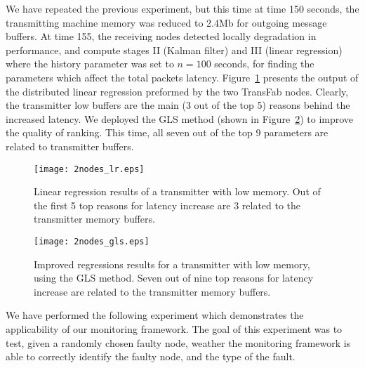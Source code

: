 \documentclass[times, 10pt,twocolumn]{article}
\begin{document}
We have repeated the previous experiment, but this time at time 150 seconds, the transmitting machine memory was reduced to 2.4Mb for outgoing message buffers. At time 155, the receiving nodes detected locally degradation in performance, and compute stages II (Kalman filter) and III (linear regression) where the history parameter was set to $n=100$ seconds, for finding the parameters which affect the total packets latency. Figure~\ref{fig:lin_reg} presents the output of the
distributed linear regression preformed by the two TransFab nodes. Clearly, the transmitter low buffers are the main (3 out of the top 5) reasons behind the increased latency. We deployed the GLS method (shown in Figure~\ref{fig:gen_lin_reg}) to improve the quality of ranking. This time, all seven out of the top 9 parameters are related to transmitter buffers.

\begin{figure}[ht!]
\begin{center}
\texttt{[image: 2nodes\_lr.eps]}\\
  \caption{Linear regression results of a transmitter with low memory. Out of the first 5 top reasons for latency increase are 3 related to the transmitter memory buffers.}
\label{fig:lin_reg}
\end{center}
\end{figure}

\begin{figure}[ht!]
\begin{center}
\texttt{[image: 2nodes\_gls.eps]}\\
 \caption{Improved regressions results for a transmitter with low memory, using the GLS method. Seven out of nine top reasons for latency increase are related to the transmitter memory buffers.}
\label{fig:gen_lin_reg}
\end{center}
\end{figure}










We have performed the following experiment which demonstrates the applicability of our monitoring framework.
The goal of this experiment was to test, given a randomly chosen faulty node, weather the monitoring framework
is able to correctly identify the faulty node, and the type of the fault.
\end{document}
